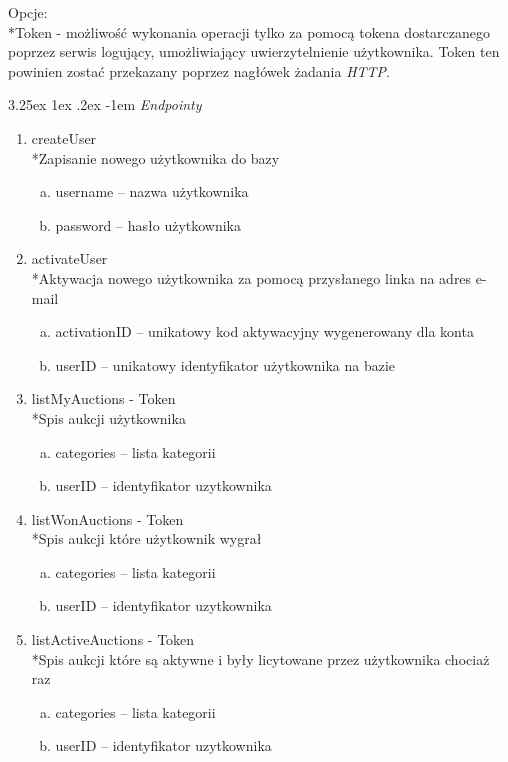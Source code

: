 \documentclass[10pt,titlepage]{article} %
\makeatletter
\renewcommand{\normalsize}{\fontsize{8pt}{10pt}\selectfont} %
\renewcommand\paragraph{\@startsection{paragraph}{5}{\z@}%
  {3.25ex \@plus1ex \@minus.2ex}%
  {-1em}%
  {\normalfont\normalsize\bfseries}}
\makeatother
\begin{document}
Opcje:\\*Token - możliwość wykonania operacji tylko za pomocą tokena dostarczanego poprzez serwis logujący, umożliwiający uwierzytelnienie użytkownika. Token ten powinien zostać przekazany poprzez nagłówek żadania \textit{HTTP}.

\paragraph{\textit{Endpointy}}
\begin{enumerate}[1.]

\item createUser
\\*Zapisanie nowego użytkownika do bazy
\begin{enumerate}[a.]
\item username – nazwa użytkownika
\item password – hasło użytkownika
\end{enumerate}

\item activateUser
\\*Aktywacja nowego użytkownika za pomocą przysłanego linka na adres e-mail
\begin{enumerate}[a.]
\item activationID – unikatowy kod aktywacyjny wygenerowany dla konta
\item userID – unikatowy identyfikator użytkownika na bazie
\end{enumerate}

\item listMyAuctions - Token
\\*Spis aukcji użytkownika
\begin{enumerate}[a.]
\item categories – lista kategorii
\item userID – identyfikator uzytkownika
\end{enumerate}

\item listWonAuctions - Token
\\*Spis aukcji które użytkownik wygrał
\begin{enumerate}[a.]
\item categories – lista kategorii
\item userID – identyfikator uzytkownika
\end{enumerate}

\item listActiveAuctions - Token
\\*Spis aukcji które są aktywne i były licytowane przez użytkownika chociaż raz
\begin{enumerate}[a.]
\item categories – lista kategorii
\item userID – identyfikator uzytkownika
\end{enumerate}


\end{enumerate}
\end{document}
